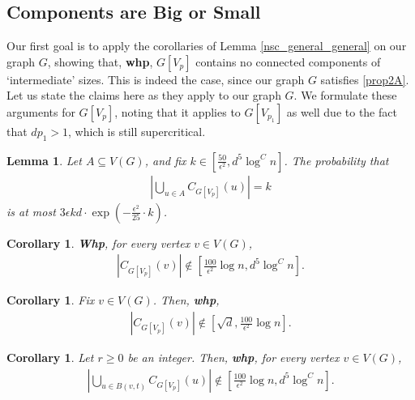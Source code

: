 \documentclass[notitlepage]{scrartcl}
\newtheorem{corollary}[thm]{Corollary}
\newtheorem{lemma}[thm]{Lemma}
\begin{document}
\subsection{Components are Big or Small}

Our first goal is to apply the corollaries of Lemma \ref{nsc_general_general} on our graph $G$, showing that, \textbf{whp}, $G[V_p]$ contains no connected components of `intermediate' sizes. This is indeed the case, since our graph $G$ satisfies \ref{prop2A}. 
Let us state the claims here as they apply to our graph $G$. We formulate these arguments for $G[V_p]$, noting that it applies to $G[V_{p_1}]$ as well due to the fact that $dp_1>1$, which is still supercritical.

\begin{lemma}\label{nsc_general}
    Let $A\subseteq V(G)$, and fix $k\in \left[\frac{50}{\epsilon^2}, d^5\log^C n\right]$. The probability that
    \begin{align*}
        \left|\bigcup_{u\in A} C_{G[V_p]}(u)\right|=k
    \end{align*}
    is at most $3\epsilon kd\cdot \exp\left(-\frac{\epsilon^2}{25}\cdot k\right)$.
\end{lemma}

\begin{corollary}\label{nsc}
    \textbf{Whp}, for every vertex $v\in V(G)$, 
        \begin{align*}
            |C_{G[V_p]}(v)|\notin \left[\frac{100}{\epsilon^2}\log n, d^5\log^C n\right].
        \end{align*}
\end{corollary} 

\begin{corollary}\label{nsc1}
    Fix $v\in V(G)$. Then, \textbf{whp}, 
        \begin{align*}
            |C_{G[V_p]}(v)|\notin \left[\sqrt{d}, \frac{100}{\epsilon^2}\log n\right].
        \end{align*}
\end{corollary}

\begin{corollary}\label{nsc_ball}
    Let $r\ge 0$ be an integer. Then, \textbf{whp}, for every vertex $v\in V(G)$,
        \begin{align*}
            \left|\bigcup_{u\in B(v,t)} C_{G[V_p]}(u)\right|\notin \left[\frac{100}{\epsilon^2}\log n, d^5\log^C n\right].
        \end{align*}
\end{corollary}
\end{document}
